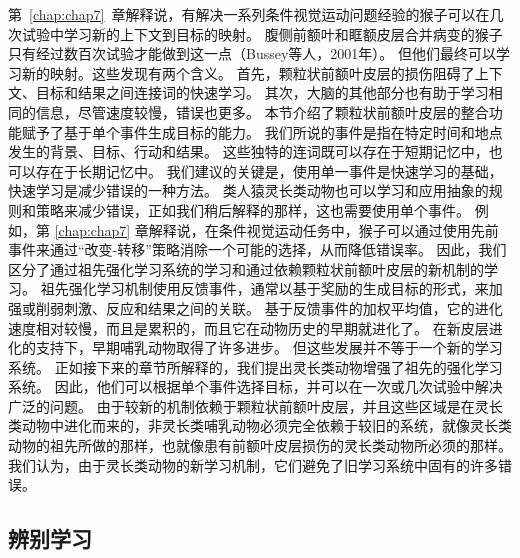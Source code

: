第~\ref{chap:chap7}~章解释说，有解决一系列条件视觉运动问题经验的猴子可以在几次试验中学习新的上下文到目标的映射。
腹侧前额叶和眶额皮层合并病变的猴子只有经过数百次试验才能做到这一点（Bussey等人，2001年）。
但他们最终可以学习新的映射。这些发现有两个含义。
首先，颗粒状前额叶皮层的损伤阻碍了上下文、目标和结果之间连接词的快速学习。
其次，大脑的其他部分也有助于学习相同的信息，尽管速度较慢，错误也更多。
本节介绍了颗粒状前额叶皮层的整合功能赋予了基于单个事件生成目标的能力。
我们所说的事件是指在特定时间和地点发生的背景、目标、行动和结果。
这些独特的连词既可以存在于短期记忆中，也可以存在于长期记忆中。
我们建议的关键是，使用单一事件是快速学习的基础，快速学习是减少错误的一种方法。
类人猿灵长类动物也可以学习和应用抽象的规则和策略来减少错误，正如我们稍后解释的那样，这也需要使用单个事件。
例如，第 \ref{chap:chap7} 章解释说，在条件视觉运动任务中，猴子可以通过使用先前事件来通过“改变-转移”策略消除一个可能的选择，从而降低错误率。
因此，我们区分了通过祖先强化学习系统的学习和通过依赖颗粒状前额叶皮层的新机制的学习。
祖先强化学习机制使用反馈事件，通常以基于奖励的生成目标的形式，来加强或削弱刺激、反应和结果之间的关联。
基于反馈事件的加权平均值，它的进化速度相对较慢，而且是累积的，而且它在动物历史的早期就进化了。
在新皮层进化的支持下，早期哺乳动物取得了许多进步。
但这些发展并不等于一个新的学习系统。
正如接下来的章节所解释的，我们提出灵长类动物增强了祖先的强化学习系统。
因此，他们可以根据单个事件选择目标，并可以在一次或几次试验中解决广泛的问题。
由于较新的机制依赖于颗粒状前额叶皮层，并且这些区域是在灵长类动物中进化而来的，非灵长类哺乳动物必须完全依赖于较旧的系统，就像灵长类动物的祖先所做的那样，也就像患有前额叶皮层损伤的灵长类动物所必须的那样。
我们认为，由于灵长类动物的新学习机制，它们避免了旧学习系统中固有的许多错误。


\subsection{辨别学习}



